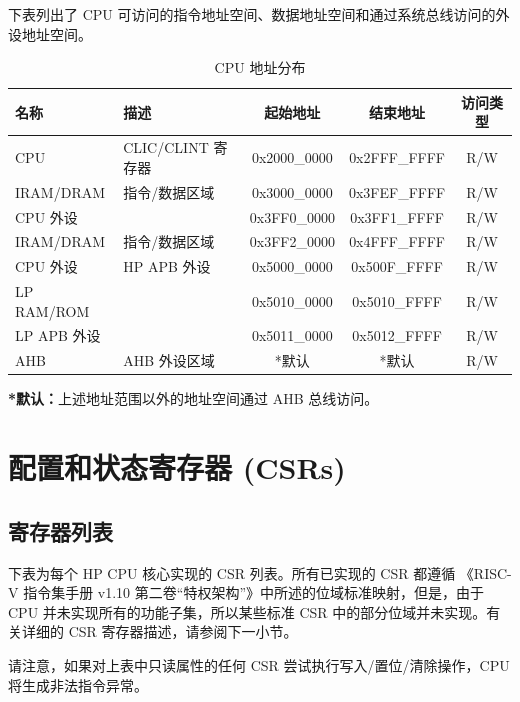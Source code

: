\documentclass[main\_\_CN.tex]{subfiles}
\begin{document}
下表列出了 CPU 可访问的指令地址空间、数据地址空间和通过系统总线访问的外设地址空间。
\begin{longtable}{| l| l |c | c | c  |}
\caption{CPU 地址分布} \label{tab:riscvcpu-mem-blocks}
\\ \hline
\rowcolor{lightgray}
\textbf{名称} & \textbf{描述}    & \textbf{起始地址}  & \textbf{结束地址}  & \textbf{访问类型}   \\ \hline
CPU \label{cpu} &  CLIC/CLINT 寄存器 &      0x2000\_0000  &  0x2FFF\_FFFF  &  R/W  \\ \hline
IRAM/DRAM\label{ram} & 指令/数据区域 &   0x3000\_0000  &  0x3FEF\_FFFF  &  R/W  \\ \hline
CPU 外设 \label{cpu_peri} &   &      0x3FF0\_0000  &  0x3FF1\_FFFF  &  R/W  \\ \hline
IRAM/DRAM\label{ram2} & 指令/数据区域 &   0x3FF2\_0000  &  0x4FFF\_FFFF  &  R/W  \\ \hline
CPU 外设 \label{cpu_peri2} & HP APB 外设  &   0x5000\_0000  &  0x500F\_FFFF  &  R/W  \\ \hline
LP RAM/ROM \label{lpram} &  &   0x5010\_0000  &  0x5010\_FFFF  &  R/W  \\ \hline
LP APB 外设 \label{lpapb} &   &   0x5011\_0000  &  0x5012\_FFFF  &  R/W  \\ \hline
AHB\label{sysahb} & AHB 外设区域 &      *默认  &  *默认  &  R/W  \\ \hline
\end{longtable}

\textbf{*默认：}上述地址范围以外的地址空间通过 AHB 总线访问。


\section{配置和状态寄存器 (CSRs)}
\hypertarget{riscvcpu-cpu-reg-summ}{}
\subsection{寄存器列表}
\label{sec:riscvcpu-cpu-reg-summ}

下表为每个 HP CPU 核心实现的 CSR 列表。所有已实现的 CSR 都遵循 《RISC-V 指令集手册 v1.10 第二卷“特权架构”》中所述的位域标准映射，但是，由于 CPU 并未实现所有的功能子集，所以某些标准 CSR 中的部分位域并未实现。有关详细的 CSR 寄存器描述，请参阅下一小节。


请注意，如果对上表中只读属性的任何 CSR 尝试执行写入/置位/清除操作，CPU 将生成非法指令异常。
\end{document}
